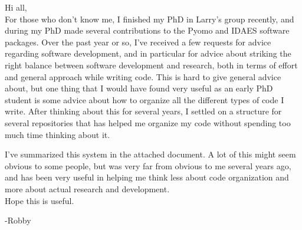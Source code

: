 \documentclass{article}
\begin{document}
Hi all,\\

For those who don't know me, I finished my PhD in Larry's group
recently, and during my PhD made several contributions to the Pyomo
and IDAES software packages.
Over the past year or so, I've received a few requests for advice regarding
software development, and in particular for advice about striking the
right balance between software development and research, both in terms
of effort and general approach while writing code. This is hard to give
general advice about, but one thing that I would have found very useful
as an early PhD student is some advice about how to organize all the different
types of code I write. After thinking about this for several years, I
settled on a structure for several repositories that has helped me organize
my code without spending too much time thinking about it.

I've summarized this system in the attached document.
A lot of this might seem obvious to some people, but was very far from
obvious to me several years ago, and has been very useful in helping 
me think less about code organization and more about actual research
and development.\\

Hope this is useful.

-Robby
\end{document}
